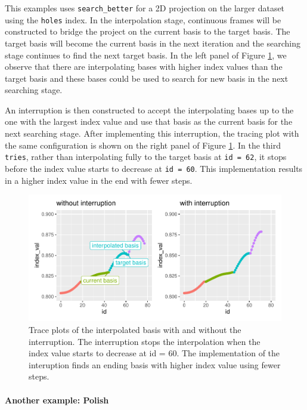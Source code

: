 \documentclass[12pt]{article}
\begin{document}
This examples uses \texttt{search\_better} for a 2D projection on the
larger dataset using the \texttt{holes} index. In the interpolation
stage, continuous frames will be constructed to bridge the project on
the current basis to the target basis. The target basis will become the
current basis in the next iteration and the searching stage continues to
find the next target basis. In the left panel of Figure
\ref{interruption}, we observe that there are interpolating bases with
higher index values than the target basis and these bases could be used
to search for new basis in the next searching stage.

An interruption is then constructed to accept the interpolating bases up
to the one with the largest index value and use that basis as the
current basis for the next searching stage. After implementing this
interruption, the tracing plot with the same configuration is shown on
the right panel of Figure \ref{interruption}. In the third
\texttt{tries}, rather than interpolating fully to the target basis at
\texttt{id\ =\ 62}, it stops before the index value starts to decrease
at \texttt{id\ =\ 60}. This implementation results in a higher index
value in the end with fewer steps.

\begin{figure}
\centering
\includegraphics{paper_files/figure-latex/interruption-1.pdf}
\caption{\label{interruption}Trace plots of the interpolated basis with
and without the interruption. The interruption stops the interpolation
when the index value starts to decrease at id = 60. The implementation
of the interuption finds an ending basis with higher index value using
fewer steps.}
\end{figure}

\hypertarget{another-example-polish}{%
\paragraph{Another example: Polish}\label{another-example-polish}}
\end{document}
